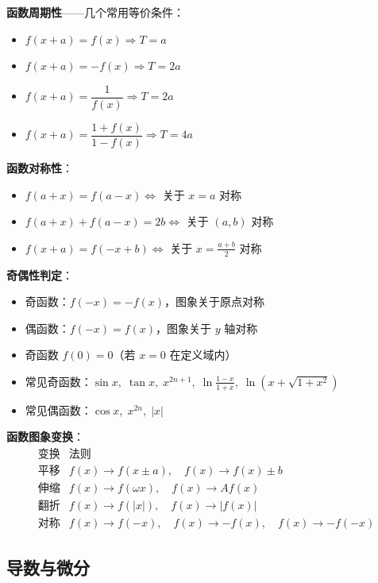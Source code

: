 \textbf{函数周期性}——几个常用等价条件：
\begin{itemize}
  \item $f(x+a) = f(x) \Rightarrow T = a$
  \item $f(x+a) = -f(x) \Rightarrow T = 2a$
  \item $f(x+a) = \dfrac{1}{f(x)} \Rightarrow T = 2a$
  \item $f(x+a) = \dfrac{1+f(x)}{1-f(x)} \Rightarrow T = 4a$
\end{itemize}

\textbf{函数对称性}：
\begin{itemize}
  \item $f(a+x) = f(a-x) \Leftrightarrow$ 关于 $x=a$ 对称
  \item $f(a+x) + f(a-x) = 2b \Leftrightarrow$ 关于 $(a,b)$ 对称
  \item $f(x+a) = f(-x+b) \Leftrightarrow$ 关于 $x=\frac{a+b}{2}$ 对称
\end{itemize}

\textbf{奇偶性判定}：
\begin{itemize}
  \item 奇函数：$f(-x) = -f(x)$，图象关于原点对称
  \item 偶函数：$f(-x) = f(x)$，图象关于 $y$ 轴对称
  \item 奇函数 $f(0)=0$（若 $x=0$ 在定义域内）
  \item 常见奇函数：$\sin x,\;\tan x,\;x^{2n+1},\;\ln\frac{1-x}{1+x},\;\ln(x+\sqrt{1+x^2})$
  \item 常见偶函数：$\cos x,\;x^{2n},\;|x|$
\end{itemize}

\textbf{函数图象变换}：
\[
\begin{array}{c|c}
\text{变换} & \text{法则} \\ \hline
\text{平移} & f(x) \to f(x\pm a),\quad f(x) \to f(x)\pm b \\
\text{伸缩} & f(x) \to f(\omega x),\quad f(x) \to A f(x) \\
\text{翻折} & f(x) \to f(|x|),\quad f(x) \to |f(x)| \\
\text{对称} & f(x) \to f(-x),\quad f(x) \to -f(x),\quad f(x) \to -f(-x)
\end{array}
\]

\subsection{导数与微分}

